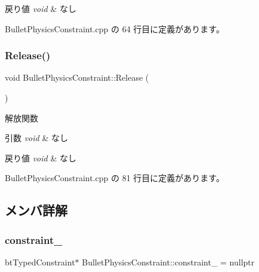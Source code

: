 \begin{DoxyRetVals}{戻り値}
{\em void} & なし \\
\hline
\end{DoxyRetVals}


 Bullet\+Physics\+Constraint.\+cpp の 64 行目に定義があります。

\mbox{\label{class_bullet_physics_constraint_ac29d9fed9b28cc7f97a10f888c0dc12f}} 
\subsubsection{\texorpdfstring{Release()}{Release()}}
{\footnotesize\ttfamily void Bullet\+Physics\+Constraint\+::\+Release (\begin{DoxyParamCaption}{ }\end{DoxyParamCaption})}



解放関数 


\begin{DoxyParams}{引数}
{\em void} & なし \\
\hline
\end{DoxyParams}

\begin{DoxyRetVals}{戻り値}
{\em void} & なし \\
\hline
\end{DoxyRetVals}


 Bullet\+Physics\+Constraint.\+cpp の 81 行目に定義があります。



\subsection{メンバ詳解}
\mbox{\label{class_bullet_physics_constraint_ac802be61cfbd2045affa8c5718eaa13a}} 
\subsubsection{\texorpdfstring{constraint\+\_\+}{constraint\_}}
{\footnotesize\ttfamily bt\+Typed\+Constraint$\ast$ Bullet\+Physics\+Constraint\+::constraint\+\_\+ = nullptr\hspace{0.3cm}{\ttfamily [private]}}



